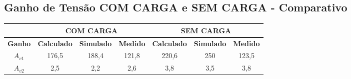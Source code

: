 \subsection{Ganho de Tensão COM CARGA e SEM CARGA - Comparativo}

\begin{center}
    \begin{tabular}{|c|c|c|c|c|c|c|}
        \cline{2-7}
        \multicolumn{1}{c|}{} & \multicolumn{3}{c|}{\textbf{COM CARGA}} & \multicolumn{3}{c|}{\textbf{SEM CARGA}} \\
        \hline
        \textbf{Ganho} & \textbf{Calculado} & \textbf{Simulado} & \textbf{Medido} & \textbf{Calculado} & \textbf{Simulado} & \textbf{Medido} \\
        \hline
        \textbf{$A_{v1}$} & 176,5 & 188,4 & 121,8 & 220,6 & 250 & 123,5 \\
        \hline
        \textbf{$A_{v2}$} & 2,5 & 2,2 & 2,6 & 3,8 & 3,5 & 3,8 \\
        \hline
    \end{tabular}
\end{center}
